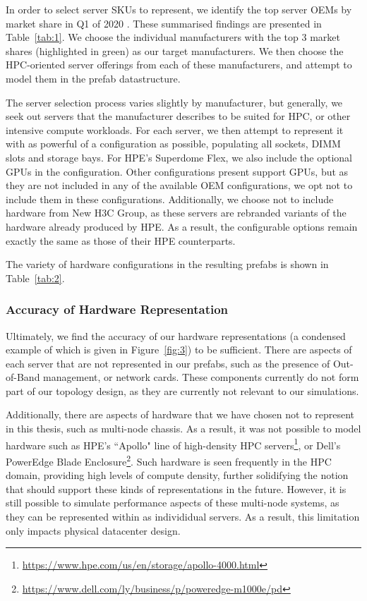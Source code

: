 \documentclass[11pt]{article}
\begin{document}
			In order to select server SKUs to represent, we identify the top server OEMs by market share in Q1 of 2020 \cite{Macatee2020}. These summarised findings are presented in Table~\ref{tab:1}.
			We choose the individual manufacturers with the top 3 market shares (highlighted in green) as our target manufacturers.
			We then choose the HPC-oriented server offerings from each of these manufacturers, and attempt to model them in the prefab datastructure.
			
			The server selection process varies slightly by manufacturer, but generally, we seek out servers that the manufacturer describes to be suited for HPC, or other intensive compute workloads.
			For each server, we then attempt to represent it with as powerful of a configuration as possible, populating all sockets, DIMM slots and storage bays.
			For HPE's Superdome Flex, we also include the optional GPUs in the configuration.
			Other configurations present support GPUs, but as they are not included in any of the available OEM configurations, we opt not to include them in these configurations.
			Additionally, we choose not to include hardware from New H3C Group, as these servers are rebranded variants of the hardware already produced by HPE.
			As a result, the configurable options remain exactly the same as those of their HPE counterparts.

			The variety of hardware configurations in the resulting prefabs is shown in Table~\ref{tab:2}.



		\subsubsection{Accuracy of Hardware Representation}
			Ultimately, we find the accuracy of our hardware representations (a condensed example of which is given in Figure~\ref{fig:3}) to be sufficient.
			There are aspects of each server that are not represented in our prefabs, such as the presence of Out-of-Band management, or network cards.
			These components currently do not form part of our topology design, as they are currently not relevant to our simulations.

			Additionally, there are aspects of hardware that we have chosen not to represent in this thesis, such as multi-node chassis.
			As a result, it was not possible to model hardware such as HPE's ``Apollo" line of high-density HPC servers\footnote{\url{https://www.hpe.com/us/en/storage/apollo-4000.html}}, or Dell's PowerEdge Blade Enclosure\footnote{\url{https://www.dell.com/ly/business/p/poweredge-m1000e/pd}}.
			Such hardware is seen frequently in the HPC domain, providing high levels of compute density, further solidifying the notion that \opendc{} should support these kinds of representations in the future.
			However, it is still possible to simulate performance aspects of these multi-node systems, as they can be represented within \opendc{} as individidual servers.
			As a result, this limitation only impacts physical datacenter design.
\end{document}
